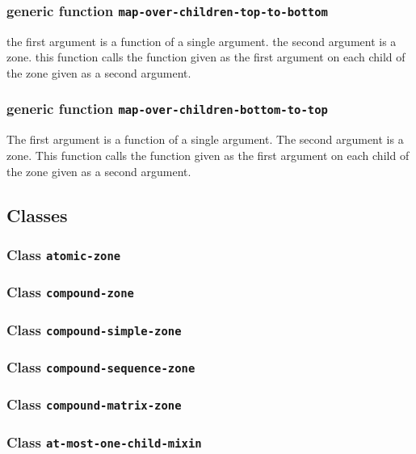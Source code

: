 \documentclass{report}
\begin{document}
\subsubsection{generic function \texttt{map-over-children-top-to-bottom}}

the first argument is a function of a single argument.  the second
argument is a zone.  this function calls the function given as the
first argument on each child of the zone given as a second argument.  

\subsubsection{generic function \texttt{map-over-children-bottom-to-top}}

The first argument is a function of a single argument.  The second
argument is a zone.  This function calls the function given as the
first argument on each child of the zone given as a second argument.  

\subsection{Classes}

\subsubsection{Class \texttt{atomic-zone}}

\subsubsection{Class \texttt{compound-zone}}

\subsubsection{Class \texttt{compound-simple-zone}}

\subsubsection{Class \texttt{compound-sequence-zone}}

\subsubsection{Class \texttt{compound-matrix-zone}}

\subsubsection{Class \texttt{at-most-one-child-mixin}}
\end{document}
